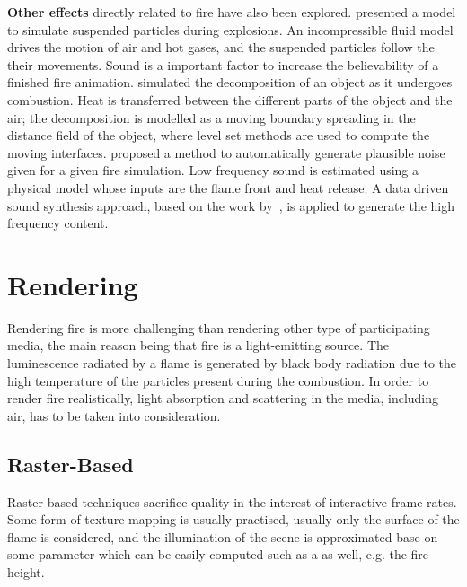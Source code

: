 \textbf{Other effects} directly related to fire have also been explored.
\cite{Feldman:2003} presented a model to simulate suspended particles during explosions.
An incompressible fluid model drives the motion of air and hot gases, and the suspended particles follow the their movements.
Sound is a important factor to increase the believability of a finished fire animation.
\cite{Melek:2005} simulated the decomposition of an object as it undergoes combustion.
Heat is transferred between the different parts of the object and the air; the decomposition is modelled as a moving boundary spreading in the distance field of the object, where level set methods are used to compute the moving interfaces.
\cite{Chadwick:2011} proposed a method to automatically generate plausible noise given for a given fire simulation.
Low frequency sound is estimated using a physical model whose inputs are the flame front and heat release.
A data driven sound synthesis approach, based on the work by~\cite{Wei:2000}, is applied to generate the high frequency content.



\section{Rendering}
\label{sec:rendering}

Rendering fire is more challenging than rendering other type of participating media, the main reason being that fire is a light-emitting source.
The luminescence radiated by a flame is generated by black body radiation due to the high temperature of the particles present during the combustion.
In order to render fire realistically, light absorption and scattering in the media, including air, has to be taken into consideration.

\subsection{Raster-Based}
\label{sec:raster_based}

Raster-based techniques sacrifice quality in the interest of interactive frame rates.
Some form of texture mapping is usually practised, usually only the surface of the flame is considered, and the illumination of the scene is approximated base on some parameter which can be easily computed such as a as well, e.g. the fire height.

